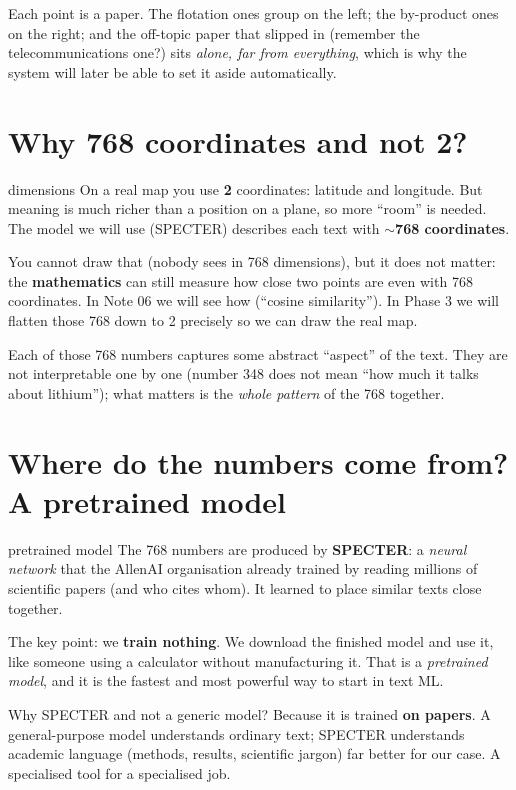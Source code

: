 \documentclass[11pt,a4paper]{article}
\begin{document}
Each point is a paper. The flotation ones group on the left; the by-product ones on the
right; and the off-topic paper that slipped in (remember the telecommunications one?) sits
\emph{alone, far from everything}, which is why the system will later be able to set it aside
automatically.

\section{Why 768 coordinates and not 2?}

\begin{concepto}{dimensions}
On a real map you use \textbf{2} coordinates: latitude and longitude. But meaning is much
richer than a position on a plane, so more ``room'' is needed. The model we will use
(SPECTER) describes each text with \textbf{$\sim$768 coordinates}.

You cannot draw that (nobody sees in 768 dimensions), but it does not matter: the
\textbf{mathematics} can still measure how close two points are even with 768 coordinates. In
Note 06 we will see how (``cosine similarity''). In Phase 3 we will flatten those 768 down to
2 precisely so we can draw the real map.
\end{concepto}

Each of those 768 numbers captures some abstract ``aspect'' of the text. They are not
interpretable one by one (number 348 does not mean ``how much it talks about lithium''); what
matters is the \emph{whole pattern} of the 768 together.

\section{Where do the numbers come from? A pretrained model}

\begin{concepto}{pretrained model}
The 768 numbers are produced by \textbf{SPECTER}: a \emph{neural network} that the AllenAI
organisation already trained by reading millions of scientific papers (and who cites whom).
It learned to place similar texts close together.

The key point: we \textbf{train nothing}. We download the finished model and use it, like
someone using a calculator without manufacturing it. That is a \emph{pretrained model}, and
it is the fastest and most powerful way to start in text ML.
\end{concepto}

\begin{ojo}
Why SPECTER and not a generic model? Because it is trained \textbf{on papers}. A
general-purpose model understands ordinary text; SPECTER understands academic language
(methods, results, scientific jargon) far better for our case. A specialised tool for a
specialised job.
\end{ojo}
\end{document}
